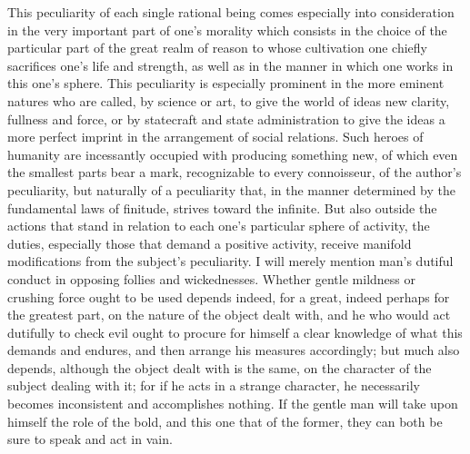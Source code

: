 \documentclass[12pt,a4paper,openany]{book}
\newcommand{\opage}[1]{\marginnote{\footnotesize\textit{[#1]}}}
\begin{document}
This peculiarity of each single rational being comes especially into consideration in
the very important part of one's morality which consists in the choice of the
particular part of the great realm of reason to whose cultivation one chiefly
sacrifices one's life and strength, as well as in the manner in which one works in
this one's sphere. This peculiarity is especially prominent in the more eminent
natures who are called, by science or art, to give the world of ideas new clarity,
fullness and force, or by statecraft and state administration to give the ideas a
more perfect imprint in the arrangement of social relations. Such heroes of humanity
are incessantly occupied with producing something new, of which even the smallest
parts bear a mark, recognizable to every connoisseur, of the author's peculiarity,
but naturally of a peculiarity that, in the manner determined by the fundamental laws
of finitude, strives toward the infinite. But also outside the actions that stand in
relation to each one's particular sphere of activity, the duties, especially those
that demand a
\setcounter{footnote}{0}%
\opage{86}positive activity, receive manifold modifications from the subject's
peculiarity. I will merely mention man's dutiful conduct in opposing follies and
wickednesses. Whether gentle mildness or crushing force ought to be used depends
indeed, for a great, indeed perhaps for the greatest part, on the nature of the
object dealt with, and he who would act dutifully to check evil ought to procure for
himself a clear knowledge of what this demands and endures, and then arrange his
measures accordingly; but much also depends, although the object dealt with is the
same, on the character of the subject dealing with it; for if he acts in a strange
character, he necessarily becomes inconsistent and accomplishes nothing. If the
gentle man will take upon himself the role of the bold, and this one that of the
former, they can both be sure to speak and act in vain.
\end{document}
